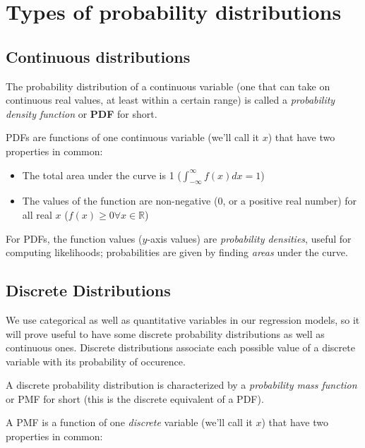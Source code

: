 \documentclass[]{book}
\providecommand{\tightlist}{%
  \setlength{\itemsep}{0pt}\setlength{\parskip}{0pt}}
\begin{document}
\hypertarget{types-of-probability-distributions}{%
\section{Types of probability distributions}\label{types-of-probability-distributions}}

\hypertarget{continuous-distributions}{%
\subsection{Continuous distributions}\label{continuous-distributions}}

The probability distribution of a continuous variable (one that can take on continuous real values, at least within a certain range) is called a \emph{probability density function} or \textbf{PDF} for short.

PDFs are functions of one continuous variable (we'll call it \(x\)) that have two properties in common:

\begin{itemize}
\tightlist
\item
  The total area under the curve is 1 (\(\int_{-\infty}^{\infty} f(x)dx = 1\))
\item
  The values of the function are non-negative (0, or a positive real number) for all real \(x\) (\(f(x) \geq 0 \forall x \in \mathbb{R}\))
\end{itemize}

For PDFs, the function values (\(y\)-axis values) are \emph{probability densities}, useful for computing likelihoods; probabilities are given by finding \emph{areas} under the curve.

\hypertarget{discrete-distributions}{%
\subsection{Discrete Distributions}\label{discrete-distributions}}

We use categorical as well as quantitative variables in our regression models, so it will prove useful to have some discrete probability distributions as well as continuous ones. Discrete distributions associate each possible value of a discrete variable with its probability of occurence.

A discrete probability distribution is characterized by a \emph{probability mass function} or PMF for short (this is the discrete equivalent of a PDF).

A PMF is a function of one \emph{discrete} variable (we'll call it \(x\)) that have two properties in common:
\end{document}

